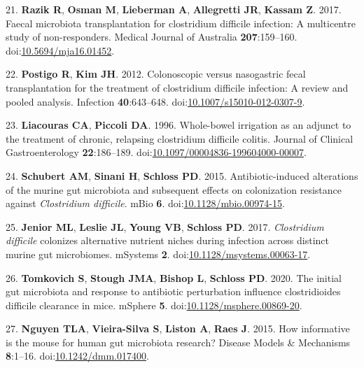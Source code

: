 \documentclass[
  11pt,
]{article}
\begin{document}
\leavevmode\hypertarget{ref-Razik2017}{}%
21. \textbf{Razik R}, \textbf{Osman M}, \textbf{Lieberman A},
\textbf{Allegretti JR}, \textbf{Kassam Z}. 2017. Faecal microbiota
transplantation for clostridium difficile infection: A multicentre study
of non-responders. Medical Journal of Australia \textbf{207}:159--160.
doi:\href{https://doi.org/10.5694/mja16.01452}{10.5694/mja16.01452}.

\leavevmode\hypertarget{ref-Postigo2012}{}%
22. \textbf{Postigo R}, \textbf{Kim JH}. 2012. Colonoscopic versus
nasogastric fecal transplantation for the treatment of clostridium
difficile infection: A review and pooled analysis. Infection
\textbf{40}:643--648.
doi:\href{https://doi.org/10.1007/s15010-012-0307-9}{10.1007/s15010-012-0307-9}.

\leavevmode\hypertarget{ref-Liacouras1996}{}%
23. \textbf{Liacouras CA}, \textbf{Piccoli DA}. 1996. Whole-bowel
irrigation as an adjunct to the treatment of chronic, relapsing
clostridium difficile colitis. Journal of Clinical Gastroenterology
\textbf{22}:186--189.
doi:\href{https://doi.org/10.1097/00004836-199604000-00007}{10.1097/00004836-199604000-00007}.

\leavevmode\hypertarget{ref-Schubert2015}{}%
24. \textbf{Schubert AM}, \textbf{Sinani H}, \textbf{Schloss PD}. 2015.
Antibiotic-induced alterations of the murine gut microbiota and
subsequent effects on colonization resistance against \emph{Clostridium
difficile}. mBio \textbf{6}.
doi:\href{https://doi.org/10.1128/mbio.00974-15}{10.1128/mbio.00974-15}.

\leavevmode\hypertarget{ref-Jenior2017}{}%
25. \textbf{Jenior ML}, \textbf{Leslie JL}, \textbf{Young VB},
\textbf{Schloss PD}. 2017. \emph{Clostridium difficile} colonizes
alternative nutrient niches during infection across distinct murine gut
microbiomes. mSystems \textbf{2}.
doi:\href{https://doi.org/10.1128/msystems.00063-17}{10.1128/msystems.00063-17}.

\leavevmode\hypertarget{ref-Tomkovich2020}{}%
26. \textbf{Tomkovich S}, \textbf{Stough JMA}, \textbf{Bishop L},
\textbf{Schloss PD}. 2020. The initial gut microbiota and response to
antibiotic perturbation influence clostridioides difficile clearance in
mice. mSphere \textbf{5}.
doi:\href{https://doi.org/10.1128/msphere.00869-20}{10.1128/msphere.00869-20}.

\leavevmode\hypertarget{ref-Nguyen2015}{}%
27. \textbf{Nguyen TLA}, \textbf{Vieira-Silva S}, \textbf{Liston A},
\textbf{Raes J}. 2015. How informative is the mouse for human gut
microbiota research? Disease Models \& Mechanisms \textbf{8}:1--16.
doi:\href{https://doi.org/10.1242/dmm.017400}{10.1242/dmm.017400}.
\end{document}
